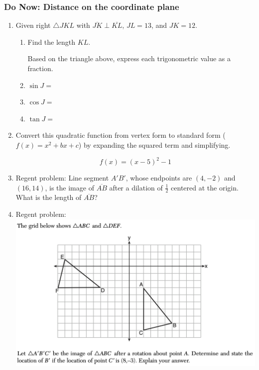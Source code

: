 \documentclass[12pt, twoside]{article}
\begin{document}
\subsubsection*{Do Now: Distance on the coordinate plane}
  \begin{enumerate}
    \item Given right $\triangle JKL$ with $\overline{JK} \perp \overline{KL}$, $JL=13$, and $JK=12$.
    \begin{enumerate}

      \item Find the length $KL$. \vspace{1cm}

        \begin{center}
        \end{center}
        \vspace{1cm}
    Based on the triangle above, express each trigonometric value as a fraction.\\
    \item $\sin J=$ \vspace{0.5cm}
    \item $\cos J=$ \vspace{0.5cm}
    \item $\tan J=$  \vspace{1.5cm}
  \end{enumerate}

    \item Convert this quadratic function from vertex form to standard form ($f(x)=x^2+bx+c$) by expanding the squared term and simplifying.

        \[f(x) = (x-5)^2-1\]
\newpage

\item Regent problem: Line segment $A'B'$, whose endpoints are $(4,-2)$ and $(16,14)$, is the image of $\overline{AB}$ after a dilation of $\frac{1}{2}$ centered at the origin. What is the length of $\overline{AB}$? \vspace{5cm}

\item Regent problem: \\
\includegraphics[width=15cm]{7-9rotation.png}



\end{enumerate}
\end{document}
